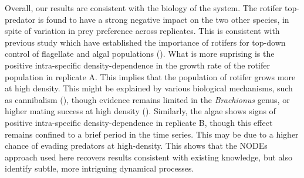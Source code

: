 \documentclass[11pt, oneside]{article}
\begin{document}
Overall, our results are consistent with the biology of the system.
The rotifer top-predator is found to have a strong negative impact on the two other species, in spite of variation in prey preference across replicates.
This is consistent with previous study which have established the importance of rotifers for top-down control of flagellate and algal populations (\cite{Arndt1993, Hiltunen2013}).
What is more suprising is the positive intra-specific density-dependence in the growth rate of the rotifer population in replicate A. 
This implies that the population of rotifer grows more at high density.
This might be explained by various biological mechanisms, such as cannibalism (\cite{Gilbert1976}), though evidence remains limited in the \textit{Brachionus} genus, or higher mating success at high density (\cite{Snell1986}). 
Similarly, the algae shows signs of positive intra-specific density-dependence in replicate B, though this effect remains confined to a brief period in the time series.
This may be due to a higher chance of evading predators at high-density. 
This shows that the NODEs approach used here recovers results consistent with existing knowledge, but also identify subtle, more intriguing dynamical processes.
\end{document}
